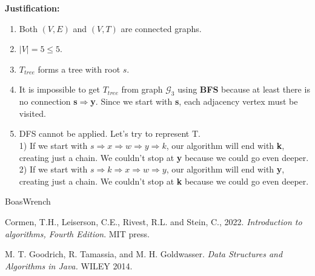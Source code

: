 \documentclass[dvipsnames]{article}
\begin{document}
\begin{enumerate}
  \color{blue}
  \textbf{Justification:}\\
  \begin{enumerate}
    \item Both $(V, E)$ and $(V, T)$ are connected graphs.
    \item $|V|=5 \leq 5$.
    \item $T_{tree}$ forms a tree with root $s$.
    \item It is impossible to get $T_{tree}$ from graph $\mathcal{G}_3$ using \textbf{BFS} because at least there is no connection \textbf{s$\Rightarrow$y}. Since we start with \textbf{s}, each adjacency vertex must be visited.
    \item DFS cannot be applied. Let's try to represent T.\\ 
1) If we start with \textbf{$s \Rightarrow x \Rightarrow w \Rightarrow y \Rightarrow k$}, our algorithm will end with \textbf{k}, creating just a chain. We couldn't stop at \textbf{y} because we could go even deeper.\\
2) If we start with \textbf{$s\Rightarrow k\Rightarrow x\Rightarrow w\Rightarrow y$}, our algorithm will end with \textbf{y}, creating just a chain. We couldn't stop at \textbf{k} because we could go even deeper.
  \end{enumerate}
  \color{black}
  
\end{enumerate}

\begin{thebibliography}{BoasWrench}

Cormen, T.H., Leiserson, C.E., Rivest, R.L. and Stein, C., 2022. \emph{Introduction to algorithms, Fourth Edition}. MIT press.

M. T. Goodrich, R. Tamassia, and M. H. Goldwasser. \emph{Data Structures and Algorithms in Java.} WILEY 2014.

\end{thebibliography}
\end{document}
